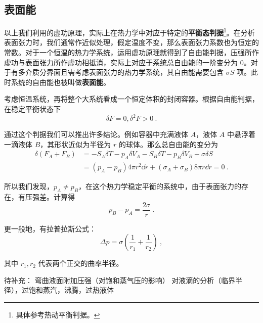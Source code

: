 \subsection{表面能}
以上我们利用的虚功原理，实际上在热力学中对应于特定的\textbf{平衡态判据}\footnote{具体参考热动平衡判据。}。在分析表面张力时，我们通常作近似处理，假定温度不变，那么表面张力系数也为恒定的常数。对于一个恒温的热力学系统，运用虚功原理就得到了自由能判据，压强所作虚功与表面张力所作虚功相抵消，实际上对应于系统总自由能的一阶变分为 $0$。对于有多介质分界面且需考虑表面张力的热力学系统，其自由能需要包含 $\sigma S$ 项。此时系统的自由能也被叫做\textbf{表面能}。

考虑恒温系统，再将整个大系统看成一个恒定体积的封闭容器。根据自由能判据，在稳定平衡状态下
\begin{equation}
\delta F=0,\delta^2 F>0~.
\end{equation}

通过这个判据我们可以推出许多结论。例如容器中充满液体 $A$，液体 $A$ 中悬浮着一滴液体 $B$，其形状近似为半径为 $r$ 的球体。那么总自由能的变分为
\begin{align}
\delta(F_A+F_B)&=-S_A\delta T-p_A\delta V_A-S_B\delta T-p_B\delta V_B+\sigma\delta S\\
&=(p_A-p_B)4\pi r^2\dd r + (\sigma_A+\sigma_B)8\pi r\dd r=0~.
\end{align}

所以我们发现，$p_A\neq p_B$，在这个热力学稳定平衡的系统中，由于表面张力的存在，有压强差。计算得
\begin{equation}
p_B-p_A=\frac{2\sigma}{r}~.
\end{equation}

更一般地，有拉普拉斯公式：
\begin{equation}\label{eq_sftens_1}
\Delta p = \sigma \left(\frac{1}{r_1}+\frac{1}{r_2}\right)~,
\end{equation}

其中 $r_1,r_2$ 代表两个正交的曲率半径。

待补充：
弯曲液面附加压强（对饱和蒸气压的影响）
对液滴的分析（临界半径），过饱和蒸汽，沸腾，过热液体